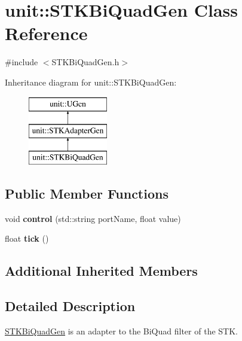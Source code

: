 \hypertarget{classunit_1_1STKBiQuadGen}{\section{unit\-:\-:S\-T\-K\-Bi\-Quad\-Gen Class Reference}
\label{classunit_1_1STKBiQuadGen}
}


{\ttfamily \#include $<$S\-T\-K\-Bi\-Quad\-Gen.\-h$>$}

Inheritance diagram for unit\-:\-:S\-T\-K\-Bi\-Quad\-Gen\-:\begin{figure}[H]
\begin{center}
\leavevmode
\includegraphics[height=3.000000cm]{classunit_1_1STKBiQuadGen}
\end{center}
\end{figure}
\subsection*{Public Member Functions}
\begin{DoxyCompactItemize}
\item 
\hypertarget{classunit_1_1STKBiQuadGen_afbaea4e23ab453fdeaa0069ddd8002a6}{void {\bfseries control} (std\-::string port\-Name, float value)}\label{classunit_1_1STKBiQuadGen_afbaea4e23ab453fdeaa0069ddd8002a6}

\item 
\hypertarget{classunit_1_1STKBiQuadGen_aeaa64c8ff587d9a9089b4cf3276255b9}{float {\bfseries tick} ()}\label{classunit_1_1STKBiQuadGen_aeaa64c8ff587d9a9089b4cf3276255b9}

\end{DoxyCompactItemize}
\subsection*{Additional Inherited Members}


\subsection{Detailed Description}
\hyperlink{classunit_1_1STKBiQuadGen}{S\-T\-K\-Bi\-Quad\-Gen} is an adapter to the Bi\-Quad filter of the S\-T\-K.

